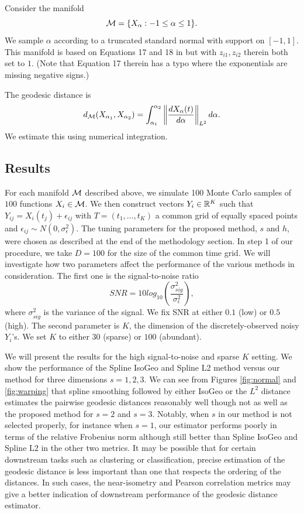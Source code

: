 Consider the manifold \[ \mathcal{M} = \{X_\alpha: -1 \le \alpha \le 1\}.\] We
sample \(\alpha\) according to a truncated standard normal with support
on \([-1,1]\). This manifold is based on Equations 17 and 18 in
\cite{Kneip2008} but with \(z_{i1}, z_{i2}\) therein both set to \(1\).
(Note that Equation 17 therein has a typo where the exponentials are
missing negative signs.)

The geodesic distance is
\[ d_{\mathcal{M}}(X_{\alpha_1},X_{\alpha_2}) = \int_{\alpha_1}^{\alpha_2} \left \| \frac{d X_\alpha (t)}{d\alpha} \right\|_{L^2} d\alpha.\]
We estimate this using numerical integration.

\subsection{Results}\label{results}

For each manifold \(\mathcal{M}\) described above, we simulate 100 Monte Carlo
samples of \(100\) functions \(X_i\in\mathcal{M}\). We then construct vectors
\(Y_i\in \mathbb{R}^K\) such that \(Y_{ij}=X_i(t_j) + \epsilon_{ij}\) with
\(T=(t_1,\ldots,t_K)\) a common grid of equally spaced points and
\(\epsilon_{ij}\sim N(0,\sigma_\epsilon^2)\). The tuning parameters for
the proposed method, \(s\) and \(h\), were chosen as described at the
end of the methodology section. In step 1 of our procedure, we take
\(D = 100\) for the size of the common time grid. We will investigate
how two parameters affect the performance of the various methods in
consideration. The first one is the signal-to-noise ratio
\[SNR = 10 log_{10}\left(\frac{\sigma^2_{sig}}{\sigma^2_\epsilon}\right),\]
where \(\sigma^2_{sig}\) is the variance of the signal. We fix SNR at
either \(0.1\) (low) or \(0.5\) (high). The second parameter is \(K\),
the dimension of the discretely-observed noisy \(Y_i\)'s. We set \(K\)
to either \(30\) (sparse) or \(100\) (abundant).

We will present the results for the high signal-to-noise and sparse
\(K\) setting. We show the performance of the Spline IsoGeo and Spline
L2 method versus our method for three dimensions \(s=1,2,3\). We can see
from Figures \ref{fig:normal} and \ref{fig:warping} that spline
smoothing followed by either IsoGeo or the \(L^2\) distance estimates
the pairwise geodesic distances reasonably well though not as well as
the proposed method for \(s=2\) and \(s=3\). Notably, when \(s\) in our
method is not selected properly, for instance when \(s=1\), our
estimator performs poorly in terms of the relative Frobenius norm
although still better than Spline IsoGeo and Spline L2 in the other two
metrics. It may be possible that for certain downstream tasks such as
clustering or classification, precise estimation of the geodesic
distance is less important than one that respects the ordering of the
distances. In such cases, the near-isometry and Pearson correlation
metrics may give a better indication of downstream performance of the
geodesic distance estimator.

